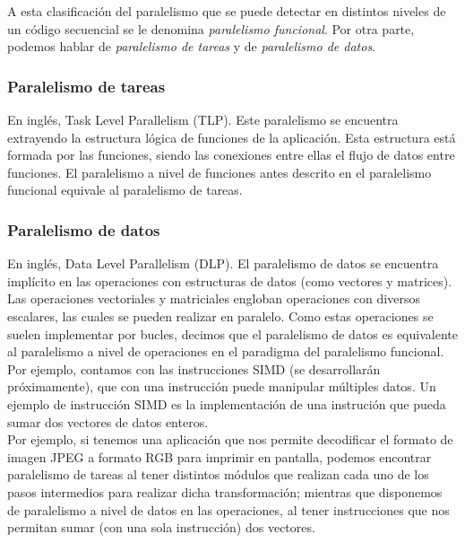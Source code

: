 A esta clasificación del paralelismo que se puede detectar en distintos niveles de un código secuencial se le denomina \emph{paralelismo funcional}. Por otra parte, podemos hablar de \emph{paralelismo de tareas} y de \emph{paralelismo de datos}.

\subsubsection{Paralelismo de tareas}
En inglés, Task Level Parallelism (TLP). Este paralelismo se encuentra extrayendo la estructura lógica de funciones de la aplicación. Esta estructura está formada por las funciones, siendo las conexiones entre ellas el flujo de datos entre funciones. El paralelismo a nivel de funciones antes descrito en el paralelismo funcional equivale al paralelismo de tareas.

\subsubsection{Paralelismo de datos}
En inglés, Data Level Parallelism (DLP). El paralelismo de datos se encuentra implícito en las operaciones con estructuras de datos (como vectores y matrices). Las operaciones vectoriales y matriciales engloban operaciones con diversos escalares, las cuales se pueden realizar en paralelo. Como estas operaciones se suelen implementar por bucles, decimos que el paralelismo de datos es equivalente al paralelismo a nivel de operaciones en el paradigma del paralelismo funcional. Por ejemplo, contamos con las instrucciones SIMD (se desarrollarán próximamente), que con una instrucción puede manipular múltiples datos. Un ejemplo de instrucción SIMD es la implementación de una instrución que pueda sumar dos vectores de datos enteros.\\

Por ejemplo, si tenemos una aplicación que nos permite decodificar el formato de imagen JPEG a formato RGB para imprimir en pantalla, podemos encontrar paralelismo de tareas al tener distintos módulos que realizan cada uno de los pasos intermedios para realizar dicha transformación; mientras que disponemos de paralelismo a nivel de datos en las operaciones, al tener instrucciones que nos permitan sumar (con una sola instrucción) dos vectores.

